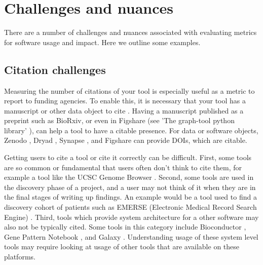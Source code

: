 \documentclass{article}
\begin{document}
\section{Challenges and nuances}

There are a number of challenges and nuances associated with evaluating metrics for software usage and impact. Here we outline some examples.

\subsection{Citation challenges}
Measuring the number of citations of your tool is especially useful as a metric to report to funding agencies. To enable this, it is necessary that your tool has a manuscript or other data object to cite \cite{chue_hong_software_2019}. Having a manuscript published as a preprint such as BioRxiv, or even in Figshare (see 'The graph-tool python library' \cite{peixoto_graph-tool_2017}), can help a tool to have a citable presence. For data or software objects, Zenodo \cite{zenodo}, Dryad \cite{datadryad}, Synapse \cite{synapse}, and Figshare \cite{figshare} can provide DOIs, which are citable. 

Getting users to cite a tool or cite it correctly can be difficult. First, some tools are so common or fundamental that users often don't think to cite them, for example a tool like the UCSC Genome Browser \cite{ucsc, kent_human_2002}. Second, some tools are used in the discovery phase of a project, and a user may not think of it when they are in the final stages of writing up findings. An example would be a tool used to find a discovery cohort of patients such as EMERSE (Electronic Medical Record Search Engine) \cite{hanauer_supporting_2015}. Third, tools which provide system architecture for a other software may also not be typically cited. Some tools in this category include Bioconductor \cite{bioconductor}, Gene Pattern Notebook \cite{reich_genepattern_2017}, and Galaxy \cite{the_galaxy_community_galaxy_2022}. Understanding usage of these system level tools may require looking at usage of other tools that are available on these platforms.
\end{document}

